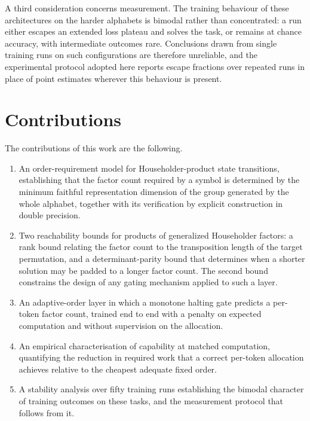 A third consideration concerns measurement. The training behaviour of these
architectures on the harder alphabets is bimodal rather than concentrated: a run
either escapes an extended loss plateau and solves the task, or remains at chance
accuracy, with intermediate outcomes rare. Conclusions drawn from single training
runs on such configurations are therefore unreliable, and the experimental
protocol adopted here reports escape fractions over repeated runs in place of
point estimates wherever this behaviour is present.

\section{Contributions}

The contributions of this work are the following.

\begin{enumerate}[label={(\arabic*)}]
	\item An order-requirement model for Householder-product state transitions,
	establishing that the factor count required by a symbol is determined by the
	minimum faithful representation dimension of the group generated by the whole
	alphabet, together with its verification by explicit construction in double
	precision.
	\item Two reachability bounds for products of generalized Householder factors:
	a rank bound relating the factor count to the transposition length of the
	target permutation, and a determinant-parity bound that determines when a
	shorter solution may be padded to a longer factor count. The second bound
	constrains the design of any gating mechanism applied to such a layer.
	\item An adaptive-order layer in which a monotone halting gate predicts a
	per-token factor count, trained end to end with a penalty on expected
	computation and without supervision on the allocation.
	\item An empirical characterisation of capability at matched computation,
	quantifying the reduction in required work that a correct per-token allocation
	achieves relative to the cheapest adequate fixed order.
	\item A stability analysis over fifty training runs establishing the bimodal
	character of training outcomes on these tasks, and the measurement protocol
	that follows from it.
\end{enumerate}
